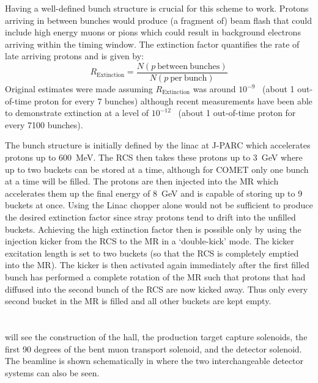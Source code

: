 Having a well-defined bunch structure is crucial for this scheme to work. 
Protons arriving in between bunches would produce (a fragment of) beam flash that could include high energy muons or pions which could result in background electrons arriving within the timing window.
The extinction factor quantifies the rate of late arriving protons and is given by:
\begin{equation}
	R_\mathrm{Extinction}=\frac{N(p~\mathrm{between~bunches})}{N(p~\mathrm{per~bunch})}
\end{equation}
Original estimates were made assuming $R_\mathrm{Extinction}$ was around $10^{-9}$~\cite{CDRphase2} (about 1 out-of-time proton for every 7 \phaseI bunches) although recent measurements have been able to demonstrate extinction at a level of $10^{-12}$~\cite{COMETExtinctionNote} (about 1 out-of-time proton for every 7100 \phaseI bunches).

The bunch structure is initially defined by the linac at J-PARC which accelerates protons up to 600~MeV.
The \ac{RCS} then takes these protons up to 3~GeV where up to two buckets can be stored at a time, although for COMET only one bunch at a time will be filled.
The protons are then injected into the \ac{MR} which accelerates them up the final energy of 8~GeV and is capable of storing up to 9 buckets at once.
Using the Linac chopper alone would not be sufficient to produce the desired extinction factor since stray protons tend to drift into the unfilled buckets.
Achieving the high extinction factor then is possible only by using the injection kicker from the \ac{RCS} to the \ac{MR} in a `double-kick' mode.
The kicker excitation length is set to two buckets (so that the \ac{RCS} is completely emptied into the \ac{MR}).  
The kicker is then activated again immediately after the first filled bunch has performed a complete rotation of the \ac{MR} such that protons that had diffused into the second bunch of the \ac{RCS} are now kicked away.
Thus only every second bucket in the \ac{MR} is filled and all other buckets are kept empty.

\section{\COMET \phaseI}
\FigPhaseI
\phaseI will see the construction of the \COMET hall, the production target capture solenoids, the first 90 degrees of the bent muon transport solenoid, and the detector solenoid.  
The beamline is shown schematically in  where the two interchangeable detector systems can also be seen.

